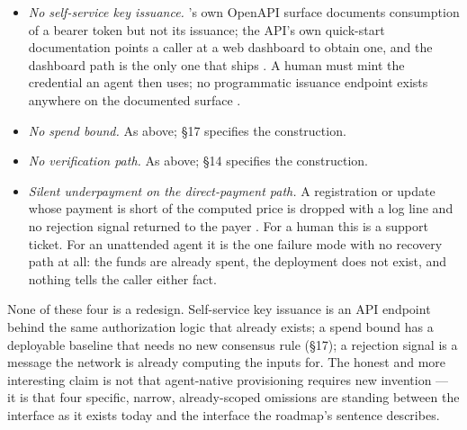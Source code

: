 \begin{itemize}
  \item \emph{No self-service key issuance.} \FluxEdge's own OpenAPI surface documents
    consumption of a bearer token but not its issuance; the API's own quick-start documentation
    points a caller at a web dashboard to obtain one, and the dashboard path is the only one that ships
    \shipped {}. A human must mint the credential an
    agent then uses; no programmatic issuance endpoint exists anywhere on the documented surface
    .
  \item \emph{No spend bound.} As above; \S17 specifies the construction.
  \item \emph{No verification path.} As above; \S14 specifies the construction.
  \item \emph{Silent underpayment on the direct-payment path.} A registration or update whose
    payment is short of the computed price is dropped with a log line and no rejection signal
    returned to the payer 
    . For a human this is a
    support ticket. For an unattended agent it is the one failure mode with no recovery path at
    all: the funds are already spent, the deployment does not exist, and nothing tells the caller
    either fact.
\end{itemize}

None of these four is a redesign. Self-service key issuance is an API endpoint behind the same
authorization logic that already exists; a spend bound has a deployable baseline that needs no
new consensus rule (\S17); a rejection signal is a message the network is already computing the
inputs for. The honest and more interesting claim is not that agent-native provisioning requires
new invention --- it is that four specific, narrow, already-scoped omissions are standing between
the interface as it exists today and the interface the roadmap's sentence describes.

